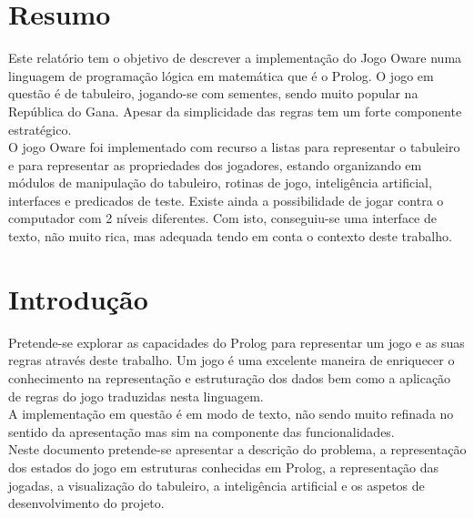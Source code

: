 \documentclass[15pt,a4paper]{article}
\begin{document}
\section*{Resumo}
Este relatório tem o objetivo de descrever a implementação do Jogo Oware numa linguagem de programação lógica em matemática que é o Prolog. O jogo em questão é de tabuleiro, jogando-se com sementes, sendo muito popular na República do Gana. Apesar da simplicidade das regras tem um forte componente estratégico.\\
\indent O jogo  Oware foi implementado com recurso a listas para representar o tabuleiro e para representar as propriedades dos jogadores, estando organizando em módulos de manipulação do tabuleiro, rotinas de jogo, inteligência artificial, interfaces e predicados de teste. Existe ainda a possibilidade de jogar contra o computador com 2 níveis diferentes. Com isto, conseguiu-se uma interface de texto, não muito rica, mas adequada tendo em conta o contexto deste trabalho.


\newpage
\renewcommand{\contentsname}{Índice}
\tableofcontents


\newpage
\section{Introdução}
Pretende-se explorar as capacidades do Prolog para representar um jogo e as suas regras através deste trabalho. Um jogo é uma excelente maneira de enriquecer o conhecimento na representação e estruturação dos dados bem como a aplicação de regras do jogo traduzidas nesta linguagem. \\
\indent A implementação em questão é em modo de texto, não sendo muito refinada no sentido da apresentação mas sim na componente das funcionalidades. \\
\indent Neste documento pretende-se apresentar a descrição do problema, a representação dos estados do jogo em estruturas conhecidas em Prolog, a representação das jogadas, a visualização do tabuleiro, a inteligência artificial e os aspetos de desenvolvimento do projeto.
\end{document}
